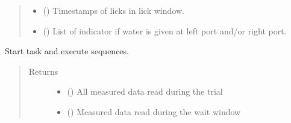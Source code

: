 \documentclass[letterpaper,10pt,english]{sphinxmanual}
\begin{document}
\begin{fulllineitems}
\begin{fulllineitems}
\begin{quote}
\begin{description}
\begin{itemize}
\item {} 
\sphinxAtStartPar
{} () \textendash{} Timestamps of licks in lick window.

\item {} 
\sphinxAtStartPar
{} () \textendash{} List of indicator if water is given at left port and/or right port.

\end{itemize}


\end{description}\end{quote}

\end{fulllineitems}


\begin{fulllineitems}
\label{\detokenize{NoSeMazeController/daqface:daqface.DAQ.DoAiMultiTaskWaitTraining.ClearTasks}}
\pysigstartsignatures
{}
\pysigstopsignatures
\end{fulllineitems}


\begin{fulllineitems}
\label{\detokenize{NoSeMazeController/daqface:daqface.DAQ.DoAiMultiTaskWaitTraining.DoTask}}
\pysigstartsignatures
{}
\pysigstopsignatures
\sphinxAtStartPar
Start task and execute sequences.
\begin{quote}\begin{description}
\item[{Returns}] \leavevmode
\sphinxAtStartPar
\begin{itemize}
\item {} 
\sphinxAtStartPar
{} () \textendash{} All measured data read during the trial

\item {} 
\sphinxAtStartPar
{} () \textendash{} Measured data read during the wait window


\end{itemize}
\end{description}
\end{quote}
\end{fulllineitems}
\end{fulllineitems}
\end{document}
